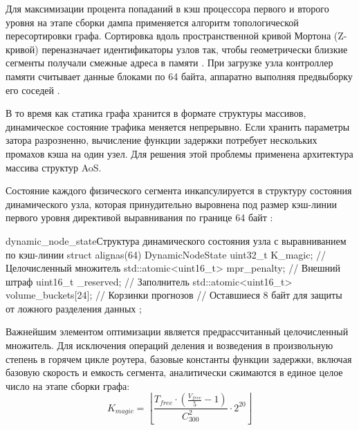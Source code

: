 Для максимизации процента попаданий в кэш процессора первого и второго уровня на этапе сборки дампа применяется алгоритм топологической пересортировки графа. Сортировка вдоль пространственной кривой Мортона (Z-кривой) переназначает идентификаторы узлов так, чтобы геометрически близкие сегменты получали смежные адреса в памяти \cite{drepper2007memory}. При загрузке узла контроллер памяти считывает данные блоками по 64 байта, аппаратно выполняя предвыборку его соседей \cite{butorin2026thread}.

В то время как статика графа хранится в формате структуры массивов, динамическое состояние трафика меняется непрерывно. Если хранить параметры затора разрозненно, вычисление функции задержки потребует нескольких промахов кэша на один узел. Для решения этой проблемы применена архитектура массива структур AoS.

Состояние каждого физического сегмента инкапсулируется в структуру состояния динамического узла, которая принудительно выровнена под размер кэш-линии первого уровня директивой выравнивания по границе 64 байт \cite{drepper2007memory}:
\begin{plaincode}{dynamic_node_state}{Структура динамического состояния узла с выравниванием по кэш-линии}
struct alignas(64) DynamicNodeState {
    uint32_t K_magic;                         // Целочисленный множитель
    std::atomic<uint16_t> mpr_penalty;        // Внешний штраф
    uint16_t _reserved;                       // Заполнитель
    std::atomic<uint16_t> volume_buckets[24]; // Корзинки прогнозов
    // Оставшиеся 8 байт для защиты от ложного разделения данных
};
\end{plaincode}

Важнейшим элементом оптимизации является предрассчитанный целочисленный множитель. Для исключения операций деления и возведения в произвольную степень в горячем цикле роутера, базовые константы функции задержки, включая базовую скорость и емкость сегмента, аналитически сжимаются в единое целое число на этапе сборки графа:
\begin{equation}
    K_{magic} = \left\lfloor \frac{T_{free} \cdot \left( \frac{V_{free}}{5} - 1 \right)}{C_{300}^2} \cdot 2^{20} \right\rfloor
\end{equation}

